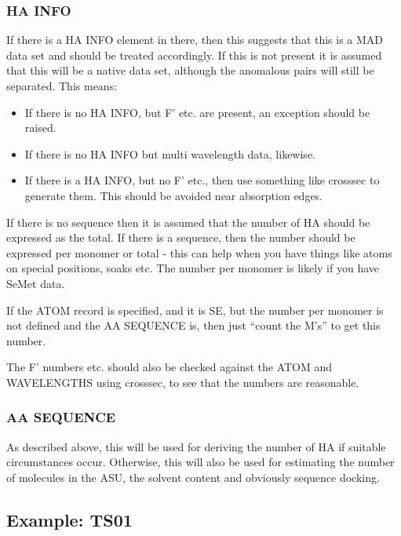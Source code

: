 \documentclass[a4paper, 11pt]{article}
\begin{document}
\subsubsection{HA INFO}

If there is a HA INFO element in there, then this suggests that this is 
a MAD data set and should be treated accordingly. If this is not present
it is assumed that this will be a native data set, although the anomalous
pairs will still be separated. This means:

\begin{itemize}
\item{If there is no HA INFO, but F' etc. are present, an exception 
should be raised.}
\item{If there is no HA INFO but multi wavelength data, likewise.}
\item{If there is a HA INFO, but no F' etc., then use something like
crosssec to generate them. This should be avoided near absorption edges.}
\end{itemize}

If there is no sequence then it is assumed that the number of HA should be
expressed as the total. If there is a sequence, then the number should be
expressed per monomer or total - this can help when you have things like
atoms on special positions, soaks etc. The number per monomer is 
likely if you have SeMet data.

If the ATOM record is specified, and it is SE, but the number per monomer
is not defined and the AA SEQUENCE is, then just ``count the M's'' to 
get this number.

The F' numbers etc. should also be checked against the ATOM and WAVELENGTHS
using crosssec, to see that the numbers are reasonable.

\subsubsection{AA SEQUENCE}

As described above, this will be used for deriving the number of HA if 
suitable circumstances occur. Otherwise, this will also be used for 
estimating the number of molecules in the ASU, the solvent content
and obviously sequence docking.

\subsection{Example: TS01}
\end{document}
